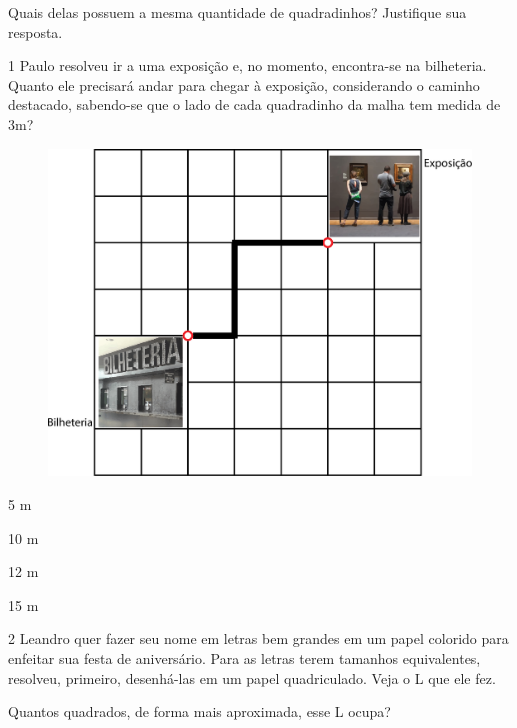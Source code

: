 Quais delas possuem a mesma quantidade de quadradinhos? Justifique sua resposta.



\num{1} Paulo resolveu ir a uma exposição e, no momento, encontra-se na
bilheteria. Quanto ele precisará andar para chegar à exposição,
considerando o caminho destacado, sabendo-se que o lado de cada
quadradinho da malha tem medida de 3m?

\begin{figure}[htpb!]
\includegraphics[width=\textwidth]{./media/image61.png}
\end{figure}

\begin{escolha}
\item
  5 m
\item
  10 m
\item
  12 m
\item
  15 m
\end{escolha}

\num{2} Leandro quer fazer seu nome em letras bem grandes em um papel colorido para enfeitar sua festa de aniversário. Para as letras terem tamanhos equivalentes, resolveu, primeiro, desenhá-las em um papel quadriculado. Veja o L que ele fez.

Quantos quadrados, de forma mais aproximada, esse L ocupa?

